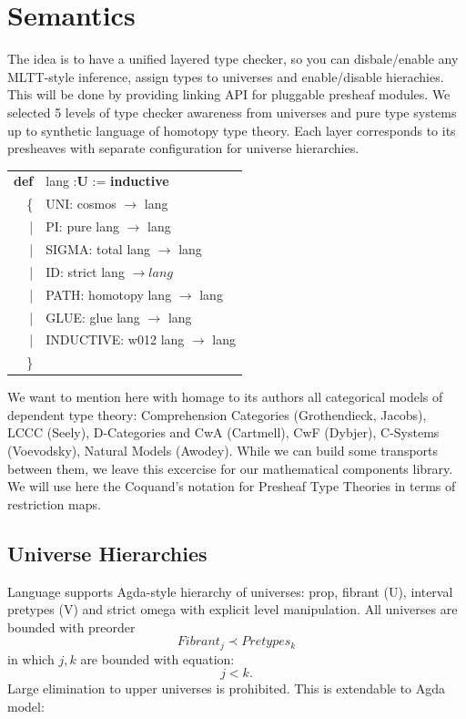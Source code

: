 \documentclass[a4paper,UKenglish,cleveref, autoref, thm-restate]{lipics-v2021}
\newcommand{\tabstyle}[0]{\scriptsize\ttfamily\fontseries{l}\selectfont}
\begin{document}
\section{Semantics}
The idea is to have a unified layered type checker, so you can disbale/enable any MLTT-style inference,
assign types to universes and enable/disable hierachies. This will be done by providing linking API for
pluggable presheaf modules. We selected 5 levels of type checker awareness from universes and pure type
systems up to synthetic language of homotopy type theory. Each layer corresponds to its presheaves with
separate configuration for universe hierarchies.
\begin{table}[ht!]
\tabstyle
\begin{tabular}{rl}
     \textbf{def} & lang :\textbf{U} := \textbf{inductive} \\
               \{ & UNI: cosmos $\rightarrow$ lang \\
               |  & PI: pure lang $\rightarrow$ lang \\
               |  & SIGMA: total lang $\rightarrow$ lang \\
               |  & ID: strict lang $\rightarrow lang$ \\
               |  & PATH: homotopy lang $\rightarrow$ lang \\
               |  & GLUE: glue lang $\rightarrow$ lang \\
               |  & INDUCTIVE: w012 lang $\rightarrow$ lang \\
               \} & \\
\end{tabular}
\end{table}
We want to mention here with homage to its authors all categorical models of dependent type theory:
Comprehension Categories (Grothendieck, Jacobs), LCCC (Seely), D-Categories and CwA (Cartmell),
CwF (Dybjer), C-Systems (Voevodsky), Natural Models (Awodey). While we can build some transports
between them, we leave this excercise for our mathematical components library.
We will use here the Coquand's notation for Presheaf Type Theories in terms of restriction maps.

\subsection{Universe Hierarchies}

Language supports Agda-style hierarchy of universes: prop, fibrant (U), interval pretypes (V) and
strict omega with explicit level manipulation. All universes are bounded with preorder
\begin{equation}
Fibrant_j \prec Pretypes_k
\end{equation}
in which $j,k$ are bounded with equation:
\begin{equation}
j < k.
\end{equation}
Large elimination to upper universes is prohibited. This is extendable to Agda model:
\end{document}
